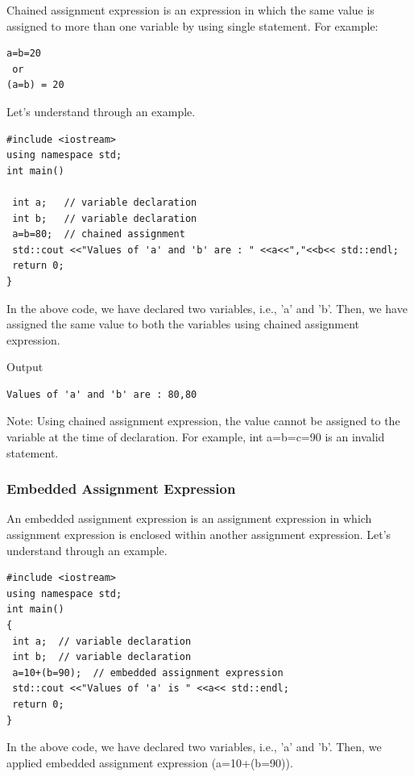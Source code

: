 \documentclass{book}
\begin{document}
Chained assignment expression is an expression in which the same value is assigned to more than one variable by using single statement. For example:

\begin{lstlisting}
a=b=20   
 or   
(a=b) = 20  
\end{lstlisting}

Let's understand through an example.

\begin{lstlisting}
#include <iostream>  
using namespace std;  
int main()  
  
 int a;   // variable declaration  
 int b;   // variable declaration  
 a=b=80;  // chained assignment  
 std::cout <<"Values of 'a' and 'b' are : " <<a<<","<<b<< std::endl;  
 return 0;  
}  
\end{lstlisting}

In the above code, we have declared two variables, i.e., 'a' and 'b'. Then, we have assigned the same value to both the variables using chained assignment expression.

Output

\begin{Verbatim}
Values of 'a' and 'b' are : 80,80  
\end{Verbatim}

Note: Using chained assignment expression, the value cannot be assigned to the variable at the time of declaration. For example, int a=b=c=90 is an invalid statement.

\subsubsection{Embedded Assignment Expression}

An embedded assignment expression is an assignment expression in which assignment expression is enclosed within another assignment expression. Let's understand through an example.

\begin{lstlisting}
#include <iostream>  
using namespace std;  
int main()  
{  
 int a;  // variable declaration  
 int b;  // variable declaration  
 a=10+(b=90);  // embedded assignment expression  
 std::cout <<"Values of 'a' is " <<a<< std::endl;  
 return 0;  
}  
\end{lstlisting}

In the above code, we have declared two variables, i.e., 'a' and 'b'. Then, we applied embedded assignment expression (a=10+(b=90)).
\end{document}
